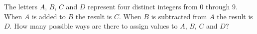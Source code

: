 The letters $A$, $B$, $C$ and $D$ represent four distinct integers from $0$ through $9$. When $A$ is added to $B$ the result is $C$. When $B$ is subtracted from $A$ the result is $D$. How many possible ways are there to assign values to $A$, $B$, $C$ and $D$?
